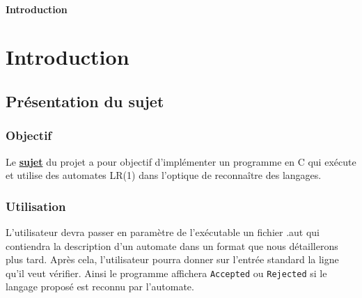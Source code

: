 \renewcommand{\chaptername}{Partie}

\ifsolo
    ~

    \vspace{1cm}

    \begin{center}
        \textbf{\LARGE Introduction} \\[1em]
    \end{center}
    \tableofcontents
\else
    \chapter{Introduction}

    \minitoc
\fi
\thispagestyle{empty}

\ifsolo \newpage \setcounter{page}{1} \fi

\section{Présentation du sujet}
\subsection{Objectif}
Le \href{http://web4.ensiie.fr/~guillaume.burel/cours/IPI/projet_2021.html}{\textbf{sujet}} du projet a pour objectif d'implémenter un programme en C qui exécute et utilise des automates LR(1) dans l'optique de reconnaître des langages.
\subsection{Utilisation}
L'utilisateur devra passer en paramètre de l'exécutable un fichier .aut qui contiendra la description d'un automate dans un format que nous détaillerons plus tard. Après cela, l'utilisateur pourra donner sur l'entrée standard la ligne qu'il veut vérifier. Ainsi le programme affichera \texttt{Accepted} ou \texttt{Rejected} si le langage proposé est reconnu par l'automate.
